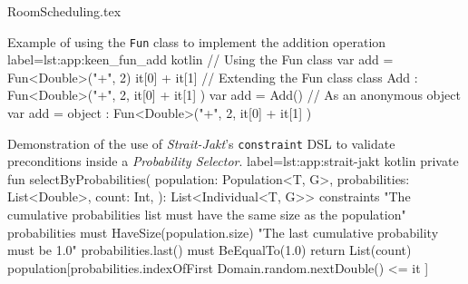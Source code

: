   {RoomScheduling.tex}

  \begin{code}{
    Example of using the \texttt{Fun} class to implement the addition 
    operation
  }{
    label=lst:app:keen_fun_add
  }{kotlin}
    // Using the Fun class
    var add = Fun<Double>("+", 2) { it[0] + it[1] }
    // Extending the Fun class
    class Add : Fun<Double>("+", 2, { it[0] + it[1] })
    var add = Add()
    // As an anonymous object
    var add = object : Fun<Double>("+", 2, { it[0] + it[1] }) {}
  \end{code}

  \begin{code}{
    Demonstration of the use of \textit{Strait-Jakt}'s \texttt{constraint} DSL
    to validate preconditions inside a \textit{Probability Selector}.
  }{
    label=lst:app:strait-jakt
  }{kotlin}
    private fun selectByProbabilities(
      population: Population<T, G>,
      probabilities: List<Double>,
      count: Int,
    ): List<Individual<T, G>> {
      constraints {
        "The cumulative probabilities list must have the same size as the population" {
          probabilities must HaveSize(population.size)
        }
        "The last cumulative probability must be 1.0" {
          probabilities.last() must BeEqualTo(1.0)
        }
      }
      return List(count) {
        population[probabilities.indexOfFirst { Domain.random.nextDouble() <= it }]
      }
    }
  \end{code}

